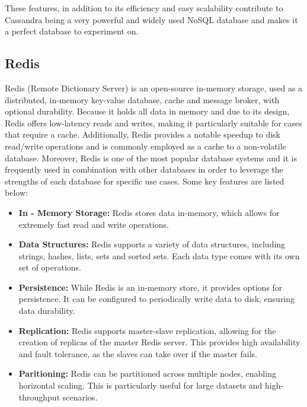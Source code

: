 \documentclass[conference]{IEEEtran}
\begin{document}
These features, in addition to its efficiency and easy scalability contribute to Cassandra being a very powerful and widely used NoSQL database and makes it a perfect database to experiment on.

\subsection{Redis}

Redis (Remote Dictionary Server) is an open-source in-memory storage, used as a distributed, in-memory key-value database, cache and message broker, with optional durability. Because it holds all
data in memory and due to its design, Redis offers low-latency reads and writes, making it particularly suitable for cases that require a cache. Additionally, Redis provides a notable speedup to disk
read/write operations and is commonly employed as a cache to a non-volatile database. Moreover, Redis is one of the most popular database systems and
it is frequently used in combination with other databases in order to leverage the strengths of each database for specific use cases. Some key features are listed below:

\begin{itemize}
	\item \textbf{In - Memory Storage:} Redis stores data in-memory, which allows for extremely fast read and write operations.
	\item \textbf{Data Structures:} Redis supports a variety of data structures, including strings, hashes, lists, sets and sorted sets. Each data type comes with its own set of operations.
	\item \textbf{Persistence:} While Redis is an in-memory store, it provides options for persistence. It can be configured to periodically write data to disk, ensuring data durability.
	\item \textbf{Replication:} Redis supports master-slave replication, allowing for the creation of replicas of the master Redis server.
	      This provides high availability and fault tolerance, as the slaves can take over if the master fails.
	\item \textbf{Paritioning:} Redis can be partitioned across multiple nodes, enabling horizontal scaling. This is particularly useful for large datasets and high-throughput scenarios.
\end{itemize}
\end{document}
